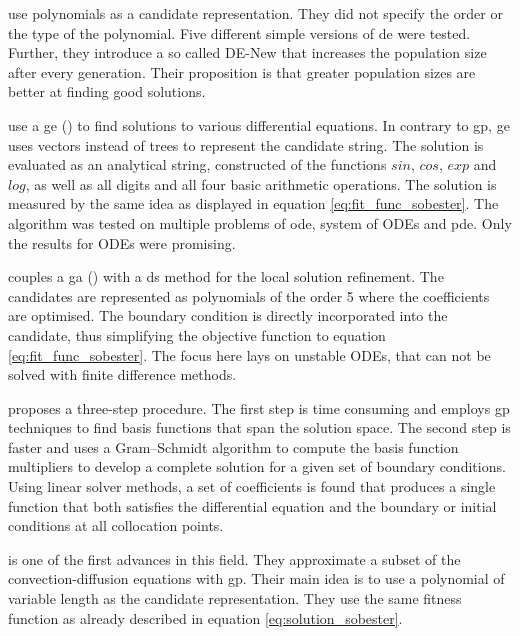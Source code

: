 \documentclass[./\jobname.tex,hidelinks]{subfiles}
\begin{document}
\cite{panagant_solving_2014} use polynomials as a candidate representation. They did not specify the order or the type of the polynomial. Five different simple versions of \gls{de} were tested. Further, they introduce a so called DE-New that increases the population size after every generation. Their proposition is that greater population sizes are better at finding good solutions. 

\cite{tsoulos_solving_2006} use a \gls{ge} (\cite{ryan_grammatical_1998}) to find solutions to various differential equations. In contrary to \gls{gp}, \gls{ge} uses vectors instead of trees to represent the candidate string. The solution is evaluated as an analytical string, constructed of the functions $sin$, $cos$, $exp$ and $log$, as well as all digits and all four basic arithmetic operations. The solution is measured by the same idea as displayed in equation \ref{eq:fit_func_sobester}. The algorithm was tested on multiple problems of \gls{ode}, system of ODEs and \gls{pde}. Only the results for ODEs were promising. 

\cite{mastorakis_unstable_2006} couples a \gls{ga} (\cite{holland_outline_1962}) with a \gls{ds} method for the local solution refinement. The candidates are represented as polynomials of the order 5 where the coefficients are optimised. The boundary condition is directly incorporated into the candidate, thus simplifying the objective function to equation \ref{eq:fit_func_sobester}. The focus here lays on unstable ODEs, that can not be solved with finite difference methods. 

\cite{kirstukas_hybrid_2005} proposes a three-step procedure. The first step is time consuming and employs \gls{gp} techniques to find basis functions that span the solution space. The second step is faster and uses a Gram–Schmidt algorithm to compute the basis function multipliers to develop a complete solution for a given set of boundary conditions. Using linear solver methods, a set of coefficients is found that produces a single function that both satisfies the differential equation and the boundary or initial conditions at all collocation points. 

\cite{howard_genetic_2001} is one of the first advances in this field. They approximate a subset of the convection-diffusion equations with \gls{gp}. Their main idea is to use a polynomial of variable length as the candidate representation. They use the same fitness function as already described in equation \ref{eq:solution_sobester}. 
\end{document}
